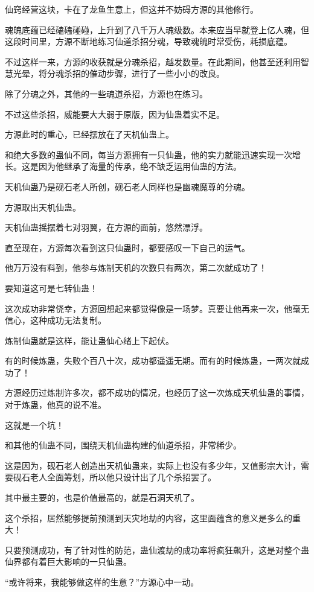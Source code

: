 \begin{this_body}
仙窍经营这块，卡在了龙鱼生意上，但这并不妨碍方源的其他修行。

魂魄底蕴已经磕磕碰碰，上升到了八千万人魂级数。本来应当早就登上亿人魂，但这段时间里，方源不断地练习仙道杀招分魂，导致魂魄时常受伤，耗损底蕴。

不过这样一来，方源的收获就是分魂杀招，越发数量。在此期间，他甚至还利用智慧光晕，将分魂杀招的催动步骤，进行了一些小小的改良。

除了分魂之外，其他的一些魂道杀招，方源也在练习。

不过这些杀招，威能要大大弱于原版，因为仙蛊着实不足。

方源此时的重心，已经摆放在了天机仙蛊上。

和绝大多数的蛊仙不同，每当方源拥有一只仙蛊，他的实力就能迅速实现一次增长。这是因为他继承了海量的传承，绝不缺乏运用仙蛊的方法。

天机仙蛊乃是砚石老人所创，砚石老人同样也是幽魂魔尊的分魂。

方源取出天机仙蛊。

天机仙蛊摇摆着七对羽翼，在方源的面前，悠然漂浮。

直至现在，方源每次看到这只仙蛊时，都要感叹一下自己的运气。

他万万没有料到，他参与炼制天机的次数只有两次，第二次就成功了！

要知道这可是七转仙蛊！

这次成功非常侥幸，方源回想起来都觉得像是一场梦。真要让他再来一次，他毫无信心，这种成功无法复制。

炼制仙蛊就是这样，能让蛊仙心绪上下起伏。

有的时候炼蛊，失败个百八十次，成功都遥遥无期。而有的时候炼蛊，一两次就成功了！

方源经历过炼制许多次，都不成功的情况，也经历了这一次炼成天机仙蛊的事情，对于炼蛊，他真的说不准。

这就是一个坑！

和其他的仙蛊不同，围绕天机仙蛊构建的仙道杀招，非常稀少。

这是因为，砚石老人创造出天机仙蛊来，实际上也没有多少年，又值影宗大计，需要砚石老人全面筹划，所以他只设计出了几个杀招罢了。

其中最主要的，也是价值最高的，就是石洞天机了。

这个杀招，居然能够提前预测到天灾地劫的内容，这里面蕴含的意义是多么的重大！

只要预测成功，有了针对性的防范，蛊仙渡劫的成功率将疯狂飙升，这是对整个蛊仙界都有着巨大影响的一只仙蛊。

“或许将来，我能够做这样的生意？”方源心中一动。


\end{this_body}
